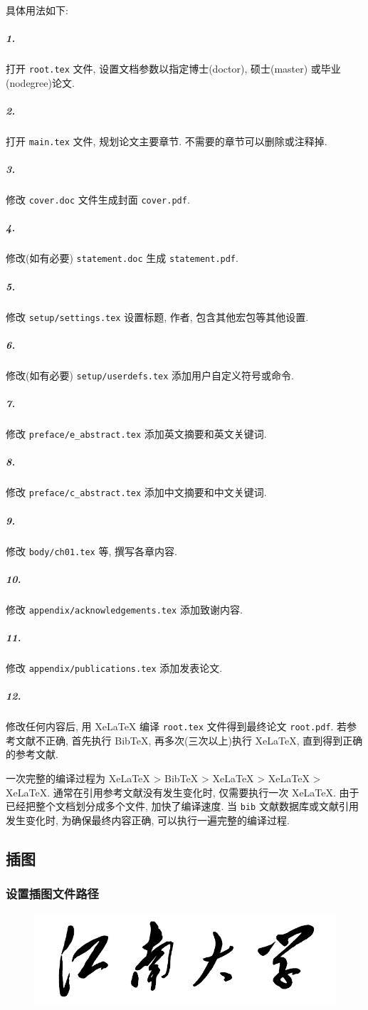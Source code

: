 具体用法如下:
\subparagraph{1.} 打开 {\tt root.tex} 文件, 设置文档参数以指定博士(doctor), 硕士(master) 或毕业(nodegree)论文.
\subparagraph{2.} 打开 {\tt main.tex} 文件, 规划论文主要章节. 不需要的章节可以删除或注释掉.
\subparagraph{3.} 修改 {\tt cover.doc} 文件生成封面 {\tt cover.pdf}.
\subparagraph{4.} 修改(如有必要) {\tt statement.doc} 生成 {\tt statement.pdf}.
\subparagraph{5.} 修改 {\tt setup/settings.tex} 设置标题, 作者, 包含其他宏包等其他设置.
\subparagraph{6.} 修改(如有必要) {\tt setup/userdefs.tex} 添加用户自定义符号或命令.
\subparagraph{7.} 修改 {\tt preface/e\_abstract.tex} 添加英文摘要和英文关键词.
\subparagraph{8.} 修改 {\tt preface/c\_abstract.tex} 添加中文摘要和中文关键词.
\subparagraph{9.} 修改 {\tt body/ch01.tex} 等, 撰写各章内容.
\subparagraph{10.} 修改 {\tt appendix/acknowledgements.tex} 添加致谢内容.
\subparagraph{11.} 修改 {\tt appendix/publications.tex} 添加发表论文.
\subparagraph{12.} 修改任何内容后, 用 XeLaTeX 编译 {\tt root.tex} 文件得到最终论文 {\tt root.pdf}. 若参考文献不正确, 首先执行 BibTeX, 再多次(三次以上)执行 XeLaTeX, 直到得到正确的参考文献.

一次完整的编译过程为 XeLaTeX > BibTeX > XeLaTeX > XeLaTeX > XeLaTeX. 通常在引用参考文献没有发生变化时, 仅需要执行一次 XeLaTeX.
由于已经把整个文档划分成多个文件, 加快了编译速度.
当 {\tt bib} 文献数据库或文献引用发生变化时, 为确保最终内容正确, 可以执行一遍完整的编译过程.

\subsection{插图}

\subsubsection{设置插图文件路径}

\begin{figure}
	\centering
	\includegraphics{logo/logo-lg.jpg}
	\label{fig1}
\end{figure}

